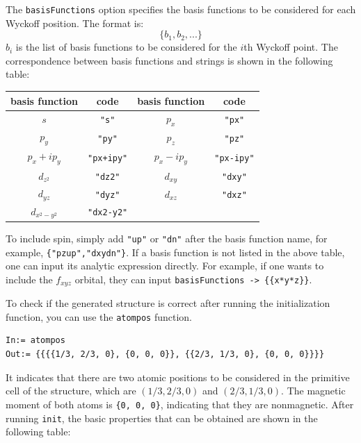 \documentclass[titlepage,a4paper,12pt,AutoFakeBold]{article}
\begin{document}
The \lstinline|basisFunctions| option specifies the basis functions to be considered for each Wyckoff position. The format is:
\[
\{b_{1},b_{2},...\}
\]
$b_{i}$ is the list of basis functions to be considered for the $i$th Wyckoff point.
The correspondence between basis functions and strings is shown in the following table:
\begin{table}[H]
	\centering 
	\label{tab:bf} %
	\begin{tabular}{cc|cc}
		\hline 
		basis function & code  & basis function  & code \tabularnewline
		\hline 
		$s$  & \lstinline!"s"! & $p_{x}$  & \lstinline!"px"! \tabularnewline
		\hline 
		$p_{y}$  & \lstinline!"py"! & $p_{z}$  & \lstinline!"pz"! \tabularnewline
		\hline 
		$p_{x}+ip_{y}$  & \lstinline!"px+ipy"! & $p_{x}-ip_{y}$  & \lstinline!"px-ipy"! \tabularnewline
		\hline 
		$d_{z^{2}}$  & \lstinline!"dz2"! & $d_{xy}$  & \lstinline!"dxy"! \tabularnewline
		\hline 
		$d_{yz}$  & \lstinline!"dyz"! & $d_{xz}$  & \lstinline!"dxz"! \tabularnewline
		\hline 
		$d_{x^{2}-y^{2}}$  & \lstinline!"dx2-y2"!  &  & \tabularnewline
		\hline 
	\end{tabular}
\end{table}
To include spin, simply add \lstinline!"up"! or \lstinline!"dn"! after the basis function name, for example, \lstinline!{"pzup","dxydn"}!. If a basis function is not listed in the above table, one can input its analytic expression directly. For example, if one wants to include the $f_{xyz}$ orbital, they can input \lstinline!basisFunctions -> {{x*y*z}}!.

To check if the generated structure is correct after running the initialization function, you can use the \lstinline|atompos| function.
\begin{lstlisting}
In:= atompos
Out:= {{{{1/3, 2/3, 0}, {0, 0, 0}}, {{2/3, 1/3, 0}, {0, 0, 0}}}}
\end{lstlisting}
It indicates that there are two atomic positions to be considered in the primitive cell of the structure, which are $(1/3,2/3,0)$ and $(2/3,1/3,0)$. The magnetic moment of both atoms is \lstinline|{0, 0, 0}|, indicating that they are nonmagnetic. After running \lstinline!init!, the basic properties that can be obtained are shown in the following table:
\end{document}
